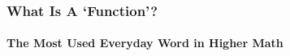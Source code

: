\begin{frame}
\frametitle{What Is A `Function'?}
\framesubtitle{The Most Used Everyday Word in Higher Math}
\label{slide:function1}
\end{frame}
